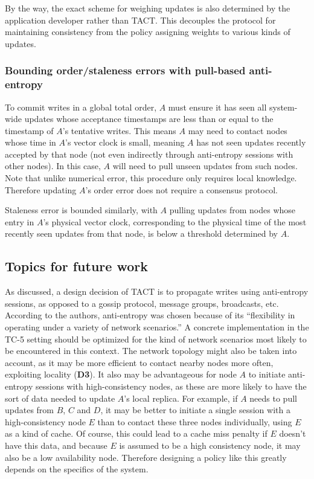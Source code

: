 By the way, the exact scheme for weighing updates is also determined by the application developer rather than TACT. This decouples the protocol for maintaining consistency from the policy assigning weights to various kinds of updates.

\subsubsection{Bounding order/staleness errors with pull-based anti-entropy}

To commit writes in a global total order, $A$ must ensure it has seen all system-wide updates whose acceptance timestamps are less than or equal to the timestamp of $A$'s tentative writes. This means $A$ may need to contact nodes whose time in $A$'s vector clock is small, meaning $A$ has not seen updates recently accepted by that node (not even indirectly through anti-entropy sessions with other nodes). In this case, $A$ will need to pull unseen updates from such nodes. Note that unlike numerical error, this procedure only requires local knowledge. Therefore updating $A$'s order error does not require a consensus protocol.

Staleness error is bounded similarly, with $A$ pulling updates from nodes whose entry in $A$'s physical vector clock, corresponding to the physical time of the most recently seen updates from that node, is below a threshold determined by $A$.

\subsection{Topics for future work}
As discussed, a design decision of TACT is to propagate writes using anti-entropy sessions, as opposed to a gossip protocol, message groups, broadcasts, etc. According to the authors, anti-entropy was chosen because of its ``flexibility in operating under a variety of network scenarios.'' \cite{2002tact} A concrete implementation in the TC-5 setting should be optimized for the kind of network scenarios most likely to be encountered in this context. The network topology might also be taken into account, as it may be more efficient to contact nearby nodes more often, exploiting locality (\textbf{D3}). It also may be advantageous for node $A$ to initiate anti-entropy sessions with high-consistency nodes, as these are more likely to have the sort of data needed to update $A$'s local replica. For example, if $A$ needs to pull updates from $B$, $C$ and $D$, it may be better to initiate a single session with a high-consistency node $E$ than to contact these three nodes individually, using $E$ as a kind of cache. Of course, this could lead to a cache miss penalty if $E$ doesn't have this data, and because $E$ is assumed to be a high consistency node, it may also be a low availability node. Therefore designing a policy like this greatly depends on the specifics of the system.

